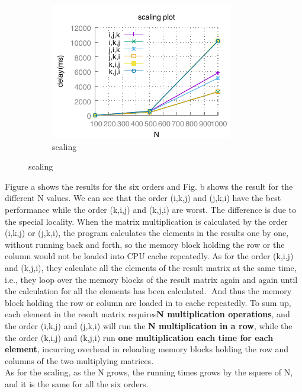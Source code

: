 \documentclass{article}
\begin{document}
\begin{figure}[h!]
\begin{subfigure}[b]{0.4\linewidth}
          \includegraphics[width=\linewidth]{matrix_scaling.pdf}
          \caption{scaling}
          \label{fig:scaling}
        \end{subfigure}
    \end{figure}

\indent Figure a shows the results for the six orders and Fig. b shows the result for the different N values. We can see that the order (i,k,j) and (j,k,i) have the best performance while the order (k,i,j) and (k,j,i) are worst. The difference is due to the special locality. When the matrix multiplication is calculated by the order (i,k,j) or (j,k,i), the program calculates the elements in the results one by one, without running back and forth, so the memory block holding the row or the column would not be loaded into CPU cache repeatedly. As for the order (k,i,j) and (k,j,i), they calculate all the elements of the result matrix at the same time, i.e., they loop over the memory blocks of the result matrix again and again until the calculation for all the elements has been calculated. And thus the memory block holding the row or column are loaded in to cache repeatedly. To sum up, each element in the result matrix requires\textbf{N multiplication operations}, and the order (i,k,j) and (j,k,i) will run the \textbf{N multiplication in a row}, while the the order (k,i,j) and (k,j,i) run \textbf{one multiplication each time for each element}, incurring overhead in reloading memory blocks holding the row and columns of the two multiplying matrices.\\
\indent As for the scaling, as the N grows, the running times grows by the squere of N, and it is the same for all the six orders.
\end{document}
